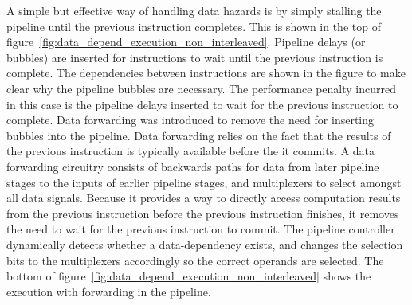 A simple but effective way of handling data hazards is by simply stalling the pipeline until the previous instruction completes.
This is shown in the top of figure~\ref{fig:data_depend_execution_non_interleaved}. 
Pipeline delays (or bubbles) are inserted for instructions to wait until the previous instruction is complete.
The dependencies between instructions are shown in the figure to make clear why the pipeline bubbles are necessary.
The performance penalty incurred in this case is the pipeline delays inserted to wait for the previous instruction to complete.
Data forwarding was introduced to remove the need for inserting bubbles into the pipeline.
Data forwarding relies on the fact that the results of the previous instruction is typically available before the it commits.  
A data forwarding circuitry consists of backwards paths for data from later pipeline stages to the inputs of earlier pipeline stages, and multiplexers to select amongst all data signals. 
Because it provides a way to directly access computation results from the previous instruction before the previous instruction finishes, it removes the need to wait for the previous instruction to commit.  
The pipeline controller dynamically detects whether a data-dependency exists, and changes the selection bits to the multiplexers accordingly so the correct operands are selected.
The bottom of figure~\ref{fig:data_depend_execution_non_interleaved} shows the execution with forwarding in the pipeline.
